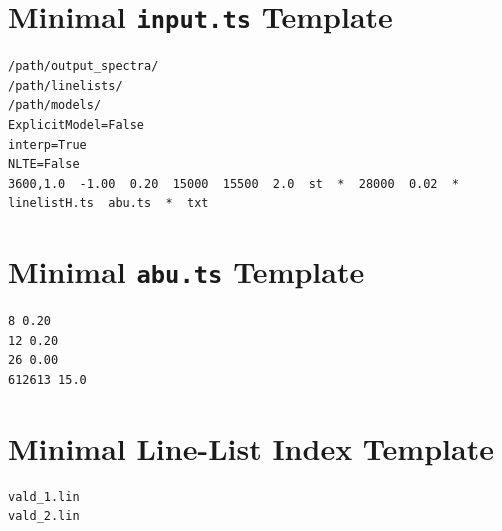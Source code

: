 \documentclass[11pt,a4paper]{article}
\newcommand{\code}[1]{\texttt{#1}}
\begin{document}
\appendix

\section{Minimal \code{input.ts} Template}

\begin{lstlisting}
/path/output_spectra/
/path/linelists/
/path/models/
ExplicitModel=False
interp=True
NLTE=False
3600,1.0  -1.00  0.20  15000  15500  2.0  st  *  28000  0.02  *  linelistH.ts  abu.ts  *  txt
\end{lstlisting}

\section{Minimal \code{abu.ts} Template}

\begin{lstlisting}
8 0.20
12 0.20
26 0.00
612613 15.0
\end{lstlisting}

\section{Minimal Line-List Index Template}

\begin{lstlisting}
vald_1.lin
vald_2.lin
\end{lstlisting}
\end{document}
